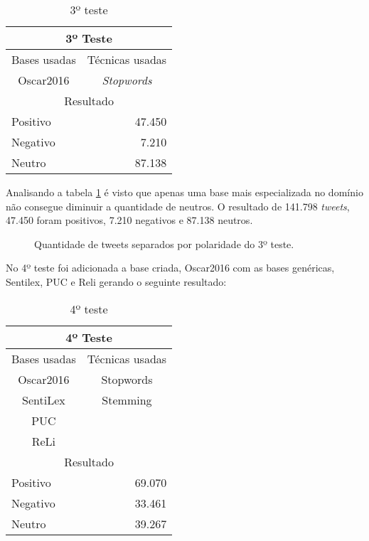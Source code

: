 \begin{table}[H]
	\centering
	\caption{3º teste}
	\label{teste-3}
	\begin{tabular}{|l|l|r|}
		\hline
		\multicolumn{3}{|c|}{3º Teste} \\ \hline
		\multicolumn{2}{|l|}{Bases usadas} & Técnicas usadas \\ \hline
		\multicolumn{2}{|c|}{Oscar2016} & \multicolumn{1}{c|}{\textit{Stopwords}} \\ \hline
		\multicolumn{3}{|c|}{Resultado} \\ \hline
		\multicolumn{2}{|l|}{Positivo} & 47.450 \\ \hline
		\multicolumn{2}{|l|}{Negativo} & 7.210 \\ \hline
		\multicolumn{2}{|l|}{Neutro} & 87.138 \\ \hline
	\end{tabular}
\end{table}


Analisando a tabela \ref{teste-3} é visto que apenas uma base mais especializada no domínio não consegue diminuir a quantidade de neutros. O resultado de 141.798 \textit{tweets}, 47.450 foram positivos, 7.210 negativos e 87.138 neutros.

\begin{figure}[H]
	\centering{}
	\caption{Quantidade de tweets separados por polaridade do 3º teste.}
	\label{teste-graf-3}
\end{figure}

No 4º teste foi adicionada a base criada, Oscar2016 com as bases genéricas, Sentilex, PUC e  Reli  gerando o seguinte resultado:

\begin{table}[H]
	\centering
	\caption{4º teste}
	\label{teste-4}
	\begin{tabular}{|c|l|r}
		\hline
		\multicolumn{3}{|c|}{4º Teste} \\ \hline
		\multicolumn{2}{|l|}{Bases usadas} & \multicolumn{1}{r|}{Técnicas usadas} \\ \hline
		\multicolumn{2}{|c|}{Oscar2016} & \multicolumn{1}{c|}{Stopwords} \\
		\multicolumn{2}{|c|}{SentiLex} & \multicolumn{1}{c|}{Stemming} \\ \cline{3-3} 
		\multicolumn{2}{|c|}{PUC} & \multicolumn{1}{c}{} \\
		\multicolumn{2}{|c|}{ReLi} & \multicolumn{1}{c}{} \\ \hline
		\multicolumn{3}{|c|}{Resultado} \\ \hline
		\multicolumn{2}{|l|}{Positivo} & \multicolumn{1}{r|}{69.070} \\ \hline
		\multicolumn{2}{|l|}{Negativo} & \multicolumn{1}{r|}{33.461} \\ \hline
		\multicolumn{2}{|l|}{Neutro} & \multicolumn{1}{r|}{39.267} \\ \hline
	\end{tabular}
\end{table}


